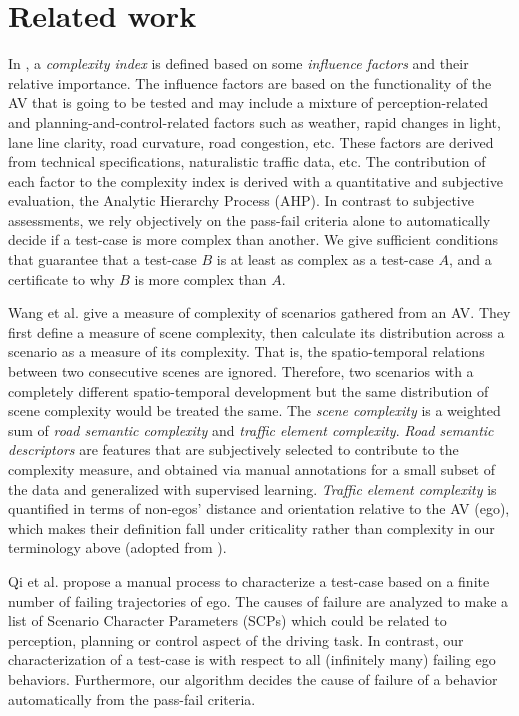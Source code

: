 \section{Related work}
In \cite{Xia.2017,Xia.2018,Gao.2019}, a \emph{complexity index} is defined based on some \emph{influence factors} and their relative importance.
%
The influence factors are based on the functionality of the AV that is going to be tested and may include a mixture of perception-related and planning-and-control-related factors such as weather, rapid changes in light, lane line clarity, road curvature, road congestion, etc.
%
These factors are derived from technical specifications, naturalistic traffic data, etc.
%
The contribution of each factor to the complexity index is derived with a quantitative and subjective evaluation, the Analytic Hierarchy Process (AHP).
%
In contrast to subjective assessments, we rely objectively on the pass-fail criteria alone to automatically decide if a test-case is more complex than another.
%
We give sufficient conditions that guarantee that a test-case $B$ is at least as complex as a test-case $A$, and a certificate to why $B$ is more complex than $A$.


Wang et al. \cite{Wang.2018} give a measure of complexity of scenarios gathered from an AV.
%
They first define a measure of scene complexity, then calculate its distribution across a scenario as a measure of its complexity.
%
That is, the spatio-temporal relations between two consecutive scenes are ignored.
%
Therefore, two scenarios with a completely different spatio-temporal development but the same distribution of scene complexity would be treated the same.
%
The \emph{scene complexity} is a weighted sum of \emph{road semantic complexity} and \emph{traffic element complexity}.
%
\emph{Road semantic descriptors} are features that are subjectively selected to contribute to the complexity measure, and obtained via manual annotations for a small subset of the data and generalized with supervised learning.
%
\emph{Traffic element complexity} is quantified in terms of non-egos' distance and orientation relative to the AV (ego), which makes their definition fall under criticality rather than complexity in our terminology above (adopted from \cite{Riedmaier.2020}).


Qi et al. \cite{Qi.2019} propose a manual process to characterize a test-case based on a finite number of failing trajectories of ego.
%
The causes of failure are analyzed to make a list of Scenario Character Parameters (SCPs) which could be related to perception, planning or control aspect of the driving task.
%
In contrast, our characterization of a test-case is with respect to all (infinitely many) failing ego behaviors.
%
Furthermore, our algorithm decides the cause of failure of a behavior automatically from the pass-fail criteria.

